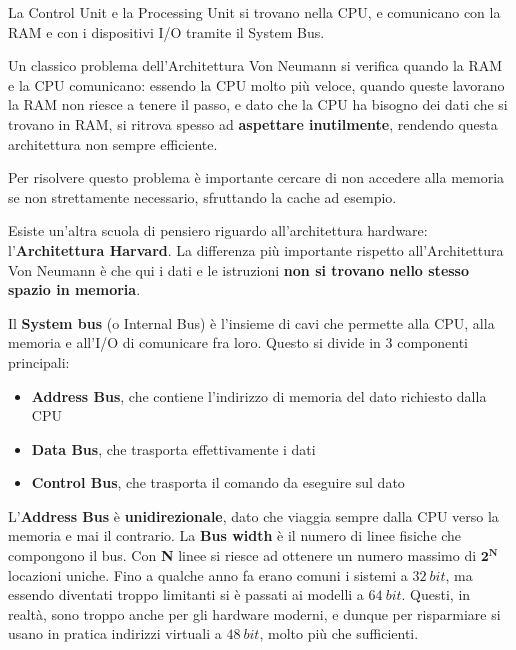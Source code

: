 \documentclass[11pt, a4paper, titlepage, oneside]{scrbook}
\begin{document}
La Control Unit e la Processing Unit si trovano nella CPU, e comunicano con la RAM e con i dispositivi I/O tramite il System Bus.

\begin{Osservazione}
\label{oss-von-neumann-bottleneck}
Un classico problema dell'Architettura Von Neumann si verifica quando la RAM e la CPU comunicano: essendo la CPU molto più veloce, quando queste lavorano la RAM non riesce a tenere il passo, e dato che la CPU ha bisogno dei dati che si trovano in RAM, si ritrova spesso ad \textbf{aspettare inutilmente}, rendendo questa architettura non sempre efficiente.
\end{Osservazione}

Per risolvere questo problema è importante cercare di non accedere alla memoria se non strettamente necessario, sfruttando la cache ad esempio.

\begin{Definizione}
\label{def-Harvard-Architecture}
Esiste un'altra scuola di pensiero riguardo all'architettura hardware: l'\textbf{Architettura Harvard}. La differenza più importante rispetto all'Architettura Von Neumann è che qui i dati e le istruzioni \textbf{non si trovano nello stesso spazio in memoria}.
\end{Definizione}

\begin{Definizione}
\label{def-system-bus}
Il \textbf{System bus} (o Internal Bus) è l'insieme di cavi che permette alla CPU, alla memoria e all'I/O di comunicare fra loro. Questo si divide in 3 componenti principali:
\begin{itemize}
    \item \textbf{Address Bus}, che contiene l'indirizzo di memoria del dato richiesto dalla CPU
    \item \textbf{Data Bus}, che trasporta effettivamente i dati
    \item \textbf{Control Bus}, che trasporta il comando da eseguire sul dato
\end{itemize}
\end{Definizione}

L'\textbf{Address Bus} è \textbf{unidirezionale}, dato che viaggia sempre dalla CPU verso la memoria e mai il contrario. La \textbf{Bus width} è il numero di linee fisiche che compongono il bus. Con \textbf{N} linee si riesce ad ottenere un numero massimo di $\bm{2^N}$ locazioni uniche. Fino a qualche anno fa erano comuni i sistemi a $\SI{32}{bit}$, ma essendo diventati troppo limitanti si è passati ai modelli a $\SI{64}{bit}$. Questi, in realtà, sono troppo anche per gli hardware moderni, e dunque per risparmiare si usano in pratica indirizzi virtuali a $\SI{48}{bit}$, molto più che sufficienti.
\end{document}
